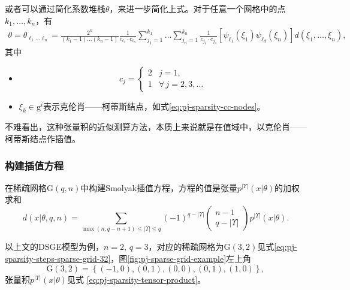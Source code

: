 或者可以通过简化系数堆栈$\theta$，来进一步简化上式。对于任意一个网格中的点$k_{1}, \ldots, k_{n}$，有
\begin{equation}
  \label{eq:pj-sparsity-theta-tensor-expansion}
  \begin{split}
    \theta = \theta_{\ell_{1} \ldots \ell_{n}}
    = \frac{
    2^{n}
    }{
    \left( k_{1} - 1 \right) \ldots \left( k_{n} - 1 \right)
    }
    \frac{
    1
    }{
    c_{\ell_{1}} \cdot c_{\ell_{n}}
    }
    \sum_{j_{1} =1}^{k_{1}} \ldots \sum_{j_{n} =1}^{k_{n}}
    \frac{
    1
    }{
    c_{j_{1}} \cdot c_{j_{n}}
    }
    \left[
    \psi_{\ell_{1}} \left( \xi_{1} \right)
    \psi_{\ell_{d}} \left( \xi_{n} \right)
    \right]
    d \left( \xi_{1}, \ldots, \xi_{n} \right),
  \end{split}
\end{equation}
其中
\begin{itemize}
  \item
  \begin{equation*}
  c_{j} =
  \begin{cases}
  2 & j=1, \\
  1 & \forall \, j=2,3,\ldots
  \end{cases}
  \end{equation*}
  \item $\xi_{k} \in \mathrm{g}^{i}$表示克伦肖——柯蒂斯结点，如式\eqref{eq:pj-sparsity-cc-nodes}。
\end{itemize}

不难看出，这种张量积的近似测算方法，本质上来说就是在值域中，以克伦肖——柯蒂斯结点作插值。

\subsubsection{构建插值方程}
\label{sec:pj-sparsity-interpolation-function}
在稀疏网格$\mathrm{G}(q,n)$中构建Smolyak插值方程，方程的值是张量$p^{\left| \Upsilon \right|} \left(x | \theta \right)$的加权求和
\begin{equation*}
  d \left( x | \theta, q, n \right)
  = \sum_{\max(n,q-n+1) \le \left| \Upsilon \right| \le q }
  \left( -1 \right)^{q - \left| \Upsilon \right|}
  \begin{pmatrix}
    n-1 \\
    q - \left| \Upsilon \right|
  \end{pmatrix}
  p^{\left| \Upsilon \right|} \left( x | \theta \right).
\end{equation*}

以上文的DSGE模型为例，$n=2, \, q=3$，对应的稀疏网格为$\mathrm{G}(3,2)$见式\eqref{eq:pj-sparsity-steps-sparse-grid-32}，图\ref{fig:pj-sparse-grid-example}左上角
\begin{equation*}
  \mathrm{G}(3,2) = \left\{ (-1,0), (0,1), (0,0), (0,1), (1,0) \right\},
\end{equation*}
张量积$p^{\left| \Upsilon \right|} \left( x | \theta \right)$见式
\eqref{eq:pj-sparsity-tensor-product}。

